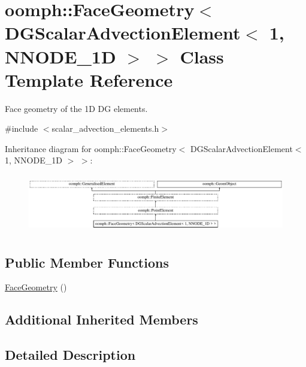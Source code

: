 \hypertarget{classoomph_1_1FaceGeometry_3_01DGScalarAdvectionElement_3_011_00_01NNODE__1D_01_4_01_4}{}\section{oomph\+:\+:Face\+Geometry$<$ D\+G\+Scalar\+Advection\+Element$<$ 1, N\+N\+O\+D\+E\+\_\+1D $>$ $>$ Class Template Reference}
\label{classoomph_1_1FaceGeometry_3_01DGScalarAdvectionElement_3_011_00_01NNODE__1D_01_4_01_4}


Face geometry of the 1D DG elements.  




{\ttfamily \#include $<$scalar\+\_\+advection\+\_\+elements.\+h$>$}

Inheritance diagram for oomph\+:\+:Face\+Geometry$<$ D\+G\+Scalar\+Advection\+Element$<$ 1, N\+N\+O\+D\+E\+\_\+1D $>$ $>$\+:\begin{figure}[H]
\begin{center}
\leavevmode
\includegraphics[height=2.580645cm]{classoomph_1_1FaceGeometry_3_01DGScalarAdvectionElement_3_011_00_01NNODE__1D_01_4_01_4}
\end{center}
\end{figure}
\subsection*{Public Member Functions}
\begin{DoxyCompactItemize}
\item 
\hyperlink{classoomph_1_1FaceGeometry_3_01DGScalarAdvectionElement_3_011_00_01NNODE__1D_01_4_01_4_a86c590cecb530375474dbc5c8a597c48}{Face\+Geometry} ()
\end{DoxyCompactItemize}
\subsection*{Additional Inherited Members}


\subsection{Detailed Description}
